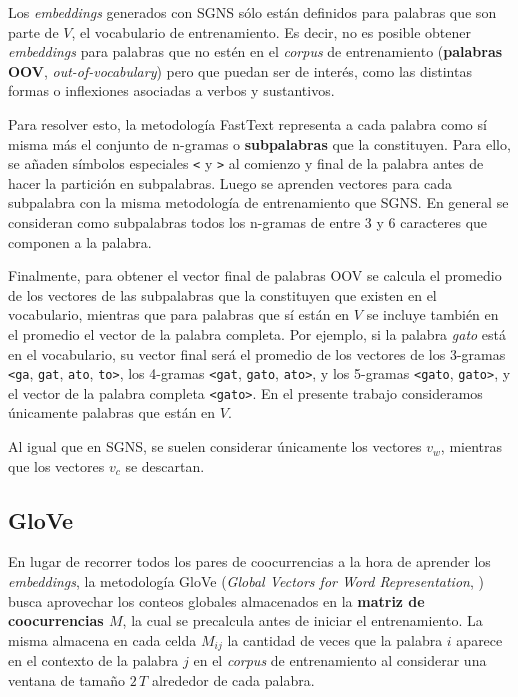 Los \emph{embeddings} generados con SGNS sólo están definidos para palabras que son parte de $V$, el vocabulario de entrenamiento. Es decir, no es posible obtener \emph{embeddings} para palabras que no estén en el \emph{corpus} de entrenamiento (\textbf{palabras OOV}, \emph{out-of-vocabulary}) pero que puedan ser de interés, como las distintas formas o inflexiones asociadas a verbos y sustantivos.

Para resolver esto, la metodología FastText \citep{bojanowski2017enriching} representa a cada palabra como sí misma más el conjunto de n-gramas o \textbf{subpalabras} que la constituyen. Para ello, se añaden símbolos especiales \texttt{<} y \texttt{>} al comienzo y final de la palabra antes de hacer la partición en subpalabras. Luego se aprenden vectores para cada subpalabra con la misma metodología de entrenamiento que SGNS. En general se consideran como subpalabras todos los n-gramas de entre 3 y 6 caracteres que componen a la palabra.

Finalmente, para obtener el vector final de palabras OOV se calcula el promedio de los vectores de las subpalabras que la constituyen que existen en el vocabulario, mientras que para palabras que sí están en $V$ se incluye también en el promedio el vector de la palabra completa. Por ejemplo, si la palabra \emph{gato} está en el vocabulario, su vector final será el promedio de los vectores 
de los 3-gramas \texttt{<ga}, \texttt{gat}, \texttt{ato}, \texttt{to>}, los 4-gramas \texttt{<gat}, \texttt{gato}, \texttt{ato>}, y los 5-gramas \texttt{<gato}, \texttt{gato>}, y el vector de la palabra completa \texttt{<gato>}. En el presente trabajo consideramos únicamente palabras que están en $V$.

Al igual que en SGNS, se suelen considerar únicamente los vectores $v_w$, mientras que los vectores $v_c$ se descartan. 

\subsection{GloVe} \label{sec:glove}

En lugar de recorrer todos los pares de coocurrencias a la hora de aprender los \emph{embeddings}, la metodología GloVe (\emph{Global Vectors for Word Representation}, \citealp{pennington2014glove}) busca aprovechar los conteos globales almacenados en la \textbf{matriz de coocurrencias $M$}, la cual se precalcula antes de iniciar el entrenamiento. La misma almacena en cada celda $M_{ij}$ la cantidad de veces que la palabra $i$ aparece en el contexto de la palabra $j$ en el \emph{corpus} de entrenamiento al considerar una ventana de tamaño $2\,T$ alrededor de cada palabra.

